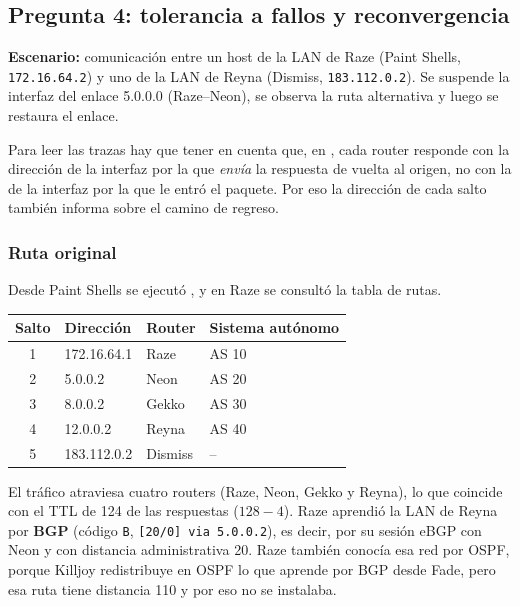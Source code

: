 \subsection{Pregunta 4: tolerancia a fallos y reconvergencia}

\textbf{Escenario:} comunicación entre un host de la LAN de Raze (Paint Shells, \texttt{172.16.64.2}) y uno de la LAN de Reyna (Dismiss, \texttt{183.112.0.2}). Se suspende la interfaz del enlace 5.0.0.0 (Raze--Neon), se observa la ruta alternativa y luego se restaura el enlace.

Para leer las trazas hay que tener en cuenta que, en , cada router responde con la dirección de la interfaz por la que \emph{envía} la respuesta de vuelta al origen, no con la de la interfaz por la que le entró el paquete. Por eso la dirección de cada salto también informa sobre el camino de regreso.

\subsubsection*{Ruta original}

Desde Paint Shells se ejecutó , y en Raze se consultó la tabla de rutas.


\begin{center}\small
\begin{tabular}{@{}clll@{}}
\toprule
Salto & Dirección & Router & Sistema autónomo \\
\midrule
1 & 172.16.64.1 & Raze & AS 10 \\
2 & 5.0.0.2 & Neon & AS 20 \\
3 & 8.0.0.2 & Gekko & AS 30 \\
4 & 12.0.0.2 & Reyna & AS 40 \\
5 & 183.112.0.2 & Dismiss & -- \\
\bottomrule
\end{tabular}
\end{center}

El tráfico atraviesa cuatro routers (Raze, Neon, Gekko y Reyna), lo que coincide con el TTL de 124 de las respuestas ($128-4$). Raze aprendió la LAN de Reyna por \textbf{BGP} (código \texttt{B}, \texttt{[20/0] via 5.0.0.2}), es decir, por su sesión eBGP con Neon y con distancia administrativa 20. Raze también conocía esa red por OSPF, porque Killjoy redistribuye en OSPF lo que aprende por BGP desde Fade, pero esa ruta tiene distancia 110 y por eso no se instalaba.


